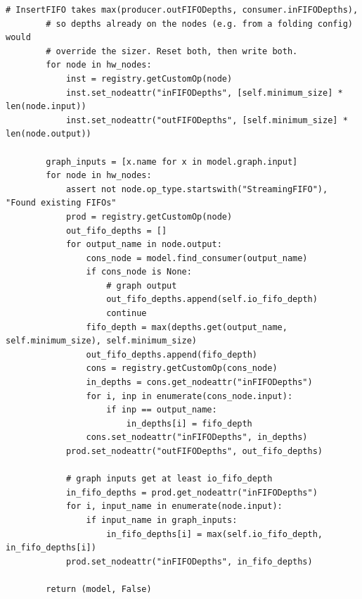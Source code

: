 \documentclass[10pt,a4paper]{article}
\begin{document}
\begin{lstlisting}[firstnumber=1202,title={\texttt{src/finn/transformation/fpgadataflow/derive\_characteristic.py}, lines 1202--1238}]
        # InsertFIFO takes max(producer.outFIFODepths, consumer.inFIFODepths),
        # so depths already on the nodes (e.g. from a folding config) would
        # override the sizer. Reset both, then write both.
        for node in hw_nodes:
            inst = registry.getCustomOp(node)
            inst.set_nodeattr("inFIFODepths", [self.minimum_size] * len(node.input))
            inst.set_nodeattr("outFIFODepths", [self.minimum_size] * len(node.output))

        graph_inputs = [x.name for x in model.graph.input]
        for node in hw_nodes:
            assert not node.op_type.startswith("StreamingFIFO"), "Found existing FIFOs"
            prod = registry.getCustomOp(node)
            out_fifo_depths = []
            for output_name in node.output:
                cons_node = model.find_consumer(output_name)
                if cons_node is None:
                    # graph output
                    out_fifo_depths.append(self.io_fifo_depth)
                    continue
                fifo_depth = max(depths.get(output_name, self.minimum_size), self.minimum_size)
                out_fifo_depths.append(fifo_depth)
                cons = registry.getCustomOp(cons_node)
                in_depths = cons.get_nodeattr("inFIFODepths")
                for i, inp in enumerate(cons_node.input):
                    if inp == output_name:
                        in_depths[i] = fifo_depth
                cons.set_nodeattr("inFIFODepths", in_depths)
            prod.set_nodeattr("outFIFODepths", out_fifo_depths)

            # graph inputs get at least io_fifo_depth
            in_fifo_depths = prod.get_nodeattr("inFIFODepths")
            for i, input_name in enumerate(node.input):
                if input_name in graph_inputs:
                    in_fifo_depths[i] = max(self.io_fifo_depth, in_fifo_depths[i])
            prod.set_nodeattr("inFIFODepths", in_fifo_depths)

        return (model, False)
\end{lstlisting}
\end{document}
